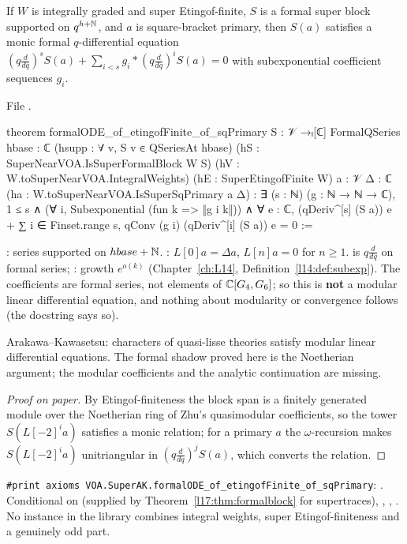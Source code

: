 \begin{theorem}\label{l17:thm:AK}
If $W$ is integrally graded and super Etingof-finite, $S$ is a formal super block supported on
$q^{h+{\mathbb{N}}}$, and $a$ is square-bracket primary, then $S(a)$ satisfies a monic formal $q$-differential
equation $(q\frac d{dq})^sS(a)+\sum_{i<s}g_i\ast(q\frac d{dq})^iS(a)=0$ with subexponential coefficient
sequences $g_i$.
\end{theorem}
\noindent File .
\begin{leancode}
theorem formalODE_of_etingofFinite_of_sqPrimary {S : 𝒱 →ₗ[ℂ] FormalQSeries} {hbase : ℂ}
    (hsupp : ∀ v, S v ∈ QSeriesAt hbase) (hS : SuperNearVOA.IsSuperFormalBlock W S)
    (hV : W.toSuperNearVOA.IntegralWeights) (hE : SuperEtingofFinite W) {a : 𝒱} {Δ : ℂ}
    (ha : W.toSuperNearVOA.IsSuperSqPrimary a Δ) :
    ∃ (s : ℕ) (g : ℕ → ℕ → ℂ), 1 ≤ s ∧ (∀ i, Subexponential (fun k => ‖g i k‖)) ∧
      ∀ e : ℂ, (qDeriv^[s] (S a)) e
        + ∑ i ∈ Finset.range s, qConv (g i) (qDeriv^[i] (S a)) e = 0 :=
\end{leancode}
\begin{dictionary}
: series supported on $hbase+{\mathbb{N}}$. : $L[0]a=\Delta a$,
$L[n]a=0$ for $n\ge1$.  is $q\frac d{dq}$ on formal series; : growth
$e^{o(k)}$ (Chapter~\ref{ch:L14}, Definition~\ref{l14:def:subexp}). The coefficients are formal series,
not elements of ${\mathbb{C}}[G_4,G_6]$; so this is \textbf{not} a modular linear differential equation, and
nothing about modularity or convergence follows (the docstring says so).
\end{dictionary}
\begin{physics}
Arakawa--Kawasetsu: characters of quasi-lisse theories satisfy modular linear differential equations.
The formal shadow proved here is the Noetherian argument; the modular coefficients and the analytic
continuation are missing.
\end{physics}
\begin{proof}[Proof on paper]
By Etingof-finiteness the block span is a finitely generated module over the Noetherian ring of Zhu's
quasimodular coefficients, so the tower $S(L[-2]^ia)$ satisfies a monic relation; for a primary $a$ the
$\omega$-recursion makes $S(L[-2]^ia)$ unitriangular in $(q\frac d{dq})^jS(a)$, which converts the relation.
\end{proof}
\begin{status}
\texttt{\#print axioms VOA.SuperAK.formalODE\_of\_etingofFinite\_of\_sqPrimary}: . Conditional on  (supplied by Theorem~\ref{l17:thm:formalblock}
for supertraces), , , . No instance in the library combines integral weights,
super Etingof-finiteness and a genuinely odd part.
\end{status}

